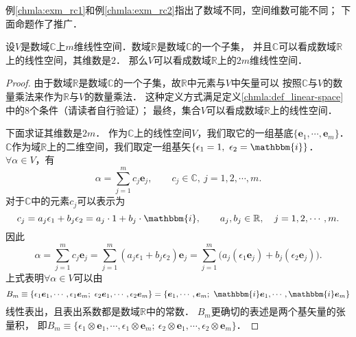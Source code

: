 
例\ref{chmla:exm_rc1}和例\ref{chmla:exm_rc2}指出了数域不同，空间维数可能不同；
下面命题作了推广．

\begin{proposition}\label{chcx:thm_rc}
    设$V$是数域$\mathbb{C}$上$m$维线性空间．数域$\mathbb{R}$是数域$\mathbb{C}$的一个子集，
    并且$\mathbb{C}$可以看成数域$\mathbb{R}$上的线性空间，其维数是$2$．
    那么$V$可以看成数域$\mathbb{R}$上的$2m$维线性空间．
\end{proposition}
\begin{proof}
由于数域$\mathbb{R}$是数域$\mathbb{C}$的一个子集，故$\mathbb{R}$中元素与$V$中矢量可以
按照$\mathbb{C}$与$V$的数量乘法来作为$\mathbb{R}$与$V$的数量乘法．
这种定义方式满足定义\ref{chmla:def_linear-space}中的8个条件（请读者自行验证）；
最终，集合$V$可以看成数域$\mathbb{R}$上的线性空间．

下面求证其维数是$2m$．
作为$\mathbb{C}$上的线性空间$V$，我们取它的一组基底$\{\boldsymbol{e}_1,\cdots,\boldsymbol{e}_m\}$．
$\mathbb{C}$作为域$\mathbb{R}$上的二维空间，我们取定一组基矢$\{\epsilon_1=1,\ \epsilon_2=\mathbbm{i}\}$．
$\forall \alpha \in V$，有
\begin{equation}
    \alpha = \sum_{j=1}^{m} c_j \boldsymbol{e}_j, \qquad
    c_j\in \mathbb{C},\  j=1,2,\cdots,m .
\end{equation}
对于$\mathbb{C}$中的元素$c_j$可以表示为
\begin{equation}
    c_j= a_j \epsilon_1 + b_j \epsilon_2 = a_j \cdot 1 + b_j \cdot \mathbbm{i},
    \qquad a_j,b_j \in \mathbb{R},\quad j=1,2,\cdots,m .
\end{equation}
因此
\begin{equation}
    \alpha= \sum_{j=1}^{m} c_j \boldsymbol{e}_j = \sum_{j=1}^{m} (a_j \epsilon_1 + b_j \epsilon_2) \boldsymbol{e}_j 
    = \sum_{j=1}^{m} \bigl(a_j (\epsilon_1 \boldsymbol{e}_j )+ b_j (\epsilon_2 \boldsymbol{e}_j )\bigr) . 
\end{equation}
上式表明$\forall \alpha \in V$可以由
\begin{equation*}
B_m\equiv\{\epsilon_1 \boldsymbol{e}_1,\cdots, \epsilon_1 \boldsymbol{e}_m;\ 
\epsilon_2 \boldsymbol{e}_1,\cdots, \epsilon_2 \boldsymbol{e}_m\}
= \{\boldsymbol{e}_1,\cdots, \boldsymbol{e}_m;\ 
\mathbbm{i} \boldsymbol{e}_1,\cdots, \mathbbm{i} \boldsymbol{e}_m\}
\end{equation*}
线性表出，且表出系数都是数域$\mathbb{R}$中的常数．
$B_m$更确切的表述是两个基矢量的张量积，
即$B_m\equiv\{\epsilon_1 \otimes \boldsymbol{e}_1,\cdots, \epsilon_1 \otimes \boldsymbol{e}_m;\ 
\epsilon_2 \otimes\boldsymbol{e}_1,\cdots, \epsilon_2 \otimes\boldsymbol{e}_m\}$．


\end{proof}
